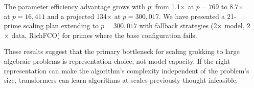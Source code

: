 \documentclass[11pt]{article}
\begin{document}
The parameter efficiency advantage grows with $p$: from 1.1$\times$ at $p = 769$ to 8.7$\times$ at $p = 16{,}411$ and a projected 134$\times$ at $p = 300{,}017$. We have presented a 21-prime scaling plan extending to $p = 300{,}017$ with fallback strategies (2$\times$ model, 2$\times$ data, RichFCO) for primes where the base configuration fails.

These results suggest that the primary bottleneck for scaling grokking to large algebraic problems is representation choice, not model capacity. If the right representation can make the algorithm's complexity independent of the problem's size, transformers can learn algorithms at scales previously thought infeasible.




\end{document}
